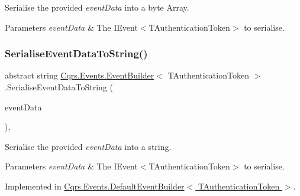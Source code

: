 Serialise the provided {\itshape event\+Data}  into a byte Array. 


\begin{DoxyParams}{Parameters}
{\em event\+Data} & The I\+Event$<$\+T\+Authentication\+Token$>$ to serialise.\\
\hline
\end{DoxyParams}
\mbox{\label{classCqrs_1_1Events_1_1EventBuilder_aefa7bfaea90123e143e108d46efc6603_aefa7bfaea90123e143e108d46efc6603}} 
\subsubsection{\texorpdfstring{Serialise\+Event\+Data\+To\+String()}{SerialiseEventDataToString()}}
{\footnotesize\ttfamily abstract string \hyperlink{classCqrs_1_1Events_1_1EventBuilder}{Cqrs.\+Events.\+Event\+Builder}$<$ T\+Authentication\+Token $>$.Serialise\+Event\+Data\+To\+String (\begin{DoxyParamCaption}\item[{\hyperlink{interfaceCqrs_1_1Events_1_1IEvent}{I\+Event}$<$ T\+Authentication\+Token $>$}]{event\+Data }\end{DoxyParamCaption})\hspace{0.3cm}{\ttfamily [protected]}, {}}



Serialise the provided {\itshape event\+Data}  into a string. 


\begin{DoxyParams}{Parameters}
{\em event\+Data} & The I\+Event$<$\+T\+Authentication\+Token$>$ to serialise.\\
\hline
\end{DoxyParams}


Implemented in \hyperlink{classCqrs_1_1Events_1_1DefaultEventBuilder_afb73a13003a94135e5c97436e7e78e13_afb73a13003a94135e5c97436e7e78e13}{Cqrs.\+Events.\+Default\+Event\+Builder$<$ T\+Authentication\+Token $>$}.


